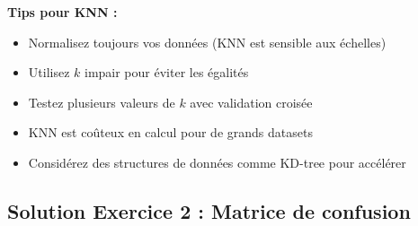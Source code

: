 \documentclass[11pt,a4paper]{article}
\begin{document}
\begin{tipbox}
\textbf{Tips pour KNN :}
\begin{itemize}
    \item Normalisez toujours vos données (KNN est sensible aux échelles)
    \item Utilisez $k$ impair pour éviter les égalités
    \item Testez plusieurs valeurs de $k$ avec validation croisée
    \item KNN est coûteux en calcul pour de grands datasets
    \item Considérez des structures de données comme KD-tree pour accélérer
\end{itemize}
\end{tipbox}

\subsection{Solution Exercice 2 : Matrice de confusion}
\end{document}

